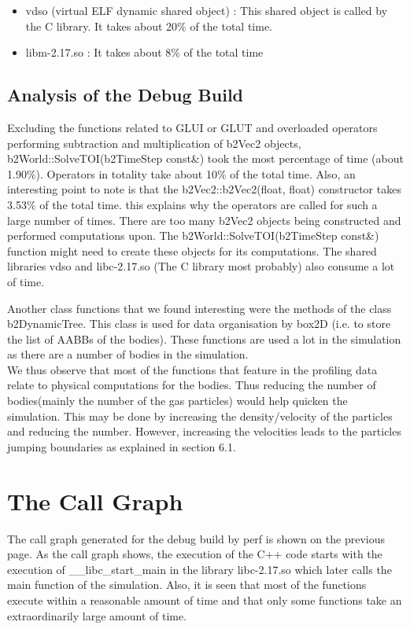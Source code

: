 \documentclass[11pt]{article}
\begin{document}
\begin{itemize}
\item vdso (virtual ELF dynamic shared object)\cite{vdso} : This shared object is called by the C library. It takes about 20\% of the total time.
\item libm-2.17.so : It takes about 8\% of the total time
\end{itemize}

\subsection{Analysis of the Debug Build}
Excluding the functions related to GLUI or GLUT and overloaded operators performing subtraction and multiplication of b2Vec2 objects, b2World::SolveTOI(b2TimeStep const\&) took the most percentage of time (about 1.90\%). Operators in totality take about 10\% of the total time. Also, an interesting point to note is that the b2Vec2::b2Vec2(float, float) constructor takes 3.53\% of the total time. this explains why the operators are called for such a large number of times. There are too many b2Vec2 objects being constructed and performed computations upon. The b2World::SolveTOI(b2TimeStep const\&) function might need to create these objects for its computations. The shared libraries vdso and libc-2.17.so (The C library most probably) also consume a lot of time.

\indent Another class functions that we found interesting were the methods of the class b2DynamicTree. This class is used for data organisation by box2D (i.e. to store the list of AABBs of the bodies)\cite{dynamicTree}. These functions are used a lot in the simulation as there are a number of bodies in the simulation. 
\\
\indent We thus observe that most of the functions that feature in the profiling data relate to physical computations for the bodies. Thus reducing the number of bodies(mainly the number of the gas particles) would help quicken the simulation. This may be done by increasing the density/velocity of the particles and reducing the number. However, increasing the velocities leads to the particles jumping boundaries as explained in section 6.1.
\section{The Call Graph}
The call graph generated for the debug build by perf is shown on the previous page. As the call graph shows, the execution of the C++ code starts with the execution of \_\_libc\_start\_main in the library libc-2.17.so which later calls the main function of the simulation. Also, it is seen that most of the functions execute within a reasonable amount of time and that only some functions take an extraordinarily large amount of time.
\end{document}
